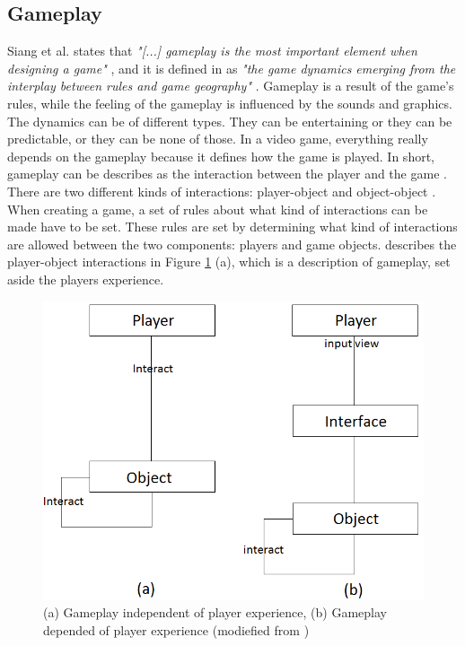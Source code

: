 \subsection{Gameplay}

Siang et al. states that \emph{"[...] gameplay is the most important element when designing a game"} \cite{umlapproach}, and it is defined in \cite{understandingvg} as \emph{"the game dynamics emerging from the interplay between rules and game geography"} . Gameplay is a result of the game's rules, while the feeling of the gameplay is influenced by the sounds and graphics. The dynamics can be of different types. They can be entertaining or they can be predictable, or they can be none of those. In a video game, everything really depends on the gameplay because it defines how the game is played. In short, gameplay can be describes as the interaction between the player and the game \cite{umlapproach}. There are two different kinds of interactions: player-object and object-object \cite{umlapproach}. When creating a game, a set of rules about what kind of interactions can be made have to be set. These rules are set by determining what kind of interactions are allowed between the two components: players and game objects. \cite{umlapproach} describes the player-object interactions in Figure \ref{fig:playerobject} (a), which is a description of gameplay, set aside the players experience.
\begin{figure}
\begin{center}
\includegraphics[scale=0.4]{player-object-merged}
\caption[The player-token interaction]{(a) Gameplay independent of player experience, (b) Gameplay depended of player experience (modiefied from \cite{umlapproach})}
\label{fig:playerobject}
\end{center}
\end{figure} 


